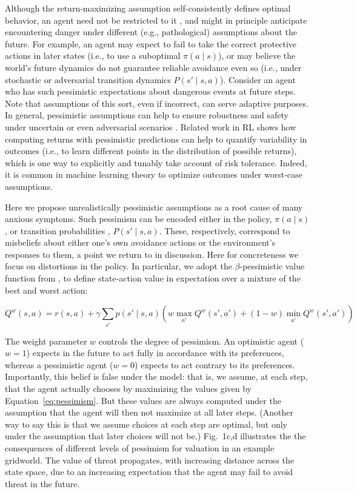 \documentclass[11pt]{article} %
\begin{document}
Although the return-maximizing assumption self-consistently defines optimal behavior, an agent need not be restricted to it \citep{symmonds2010}, and might in principle anticipate encountering danger under different (e.g., pathological) assumptions about the future. For example, an agent may expect to fail to take the correct protective actions in later states (i.e., to use a suboptimal $\pi(a \mid s)$), or may believe the world's future dynamics do not guarantee reliable avoidance even so (i.e., under stochastic or adversarial transition dynamics $P(s' \mid s,a)$). Consider an agent who has such pessimistic expectations about dangerous events at future steps. Note that assumptions of this sort, even if incorrect, can serve adaptive purposes. In general, pessimistic assumptions can help to ensure robustness and safety under uncertain or even adversarial scenarios \cite{Garcia2015}. Related work in RL shows how computing returns with pessimistic predictions can help to quantify variability in outcomes (i.e., to learn different points in the distribution of possible returns)\cite{bellemare2017}, which is one way to explicitly and tunably take account of risk tolerance. Indeed, it is common in machine learning theory to optimize outcomes under worst-case assumptions. 

Here we propose unrealistically pessimistic assumptions as a root cause of many anxious symptoms. Such pessimism can be encoded either in the policy, $\pi(a \mid s)$, or transition probabilities , $P(s' \mid s,a)$. These, respectively, correspond to misbeliefs about either one's own avoidance actions or the environment's responses to them, a point we return to in discussion. Here for concreteness we focus on distortions in the policy. In particular, we adopt the $\beta$-pessimistic value function from \cite{Gaskett2003}, to define state-action value in expectation over a mixture of the best and worst action:

\begin{equation}\label{eq:pessimism}
Q^w(s,a) = r(s,a) + \gamma \sum_{s'} p(s' \mid s,a) \left( w \max_{a'} Q^w(s',a') + (1 - w) \min_{a'} Q^w(s',a') \right)
\end{equation}

The weight parameter $w$ controls the degree of pessimism. An optimistic agent ($w = 1$) expects in the future to act fully in accordance with its preferences, whereas a pessimistic agent ($w = 0$) expects to act contrary to its preferences. Importantly, this belief is false under the model: that is, we assume, at each step, that the agent actually chooses by maximizing the values given by Equation~\ref{eq:pessimism}. But these values are always computed under the assumption that the agent will then not maximize at all later steps. (Another way to say this is that we assume choices at each step are optimal, but only under the assumption that later choices will not be.) Fig.~1c,d illustrates the the consequences of different levels of pessimism for valuation in an example gridworld. The value of threat propagates, with increasing distance across the state space, due to an increasing expectation that the agent may fail to avoid threat in the future.
\end{document}

